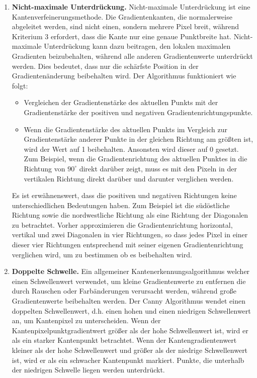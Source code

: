 \begin{enumerate}
	\item \textbf{Nicht-maximale Unterdrückung.} Nicht-maximale Unterdrückung ist eine Kantenverfeinerungsmethode. Die Gradientenkanten, die normalerweise abgeleitet werden, sind nicht einen, sondern mehrere Pixel breit, während Kriterium 3 erfordert, dass die Kante nur eine genaue Punktbreite hat. Nicht-maximale Unterdrückung kann dazu beitragen, den lokalen maximalen Gradienten beizubehalten, während alle anderen Gradientenwerte unterdrückt werden. Dies bedeutet, dass nur die schärfste Position in der Gradientenänderung beibehalten wird. Der Algorithmus funktioniert wie folgt:
	\begin{itemize}
	\item Vergleichen der Gradientenstärke des aktuellen Punkts mit der Gradientenstärke der positiven und negativen Gradientenrichtungspunkte.
	\item Wenn die Gradientenstärke des aktuellen Punkts im Vergleich zur Gradientenstärke anderer Punkte in der gleichen Richtung am größten ist, wird der Wert auf 1 beibehalten. Ansonsten wird dieser auf 0 gesetzt. Zum Beispiel, wenn die Gradientenrichtung des aktuellen Punktes in die Richtung von $90^{\circ}$ direkt darüber zeigt, muss es mit den Pixeln in der vertikalen Richtung direkt darüber und darunter verglichen werden.
	\end{itemize}
	
	Es ist erwähnenswert, dass die positiven und negativen Richtungen keine unterschiedlichen Bedeutungen haben. Zum Beispiel ist die südöstliche Richtung sowie die nordwestliche Richtung als eine Richtung der Diagonalen zu betrachtet. Vorher approximieren die Gradientenrichtung horizontal, vertikal und zwei Diagonalen in vier Richtungen, so dass jedes Pixel in einer dieser vier Richtungen entsprechend mit seiner eigenen Gradientenrichtung verglichen wird, um zu bestimmen ob es beibehalten wird. 
	
	
	\item \textbf{Doppelte Schwelle.} Ein allgemeiner Kantenerkennungsalgorithmus welcher einen Schwellenwert verwendet, um kleine Gradientenwerte zu entfernen die durch Rauschen oder Farbänderungen verursacht werden, während große Gradientenwerte beibehalten werden.
Der Canny Algorithmus wendet einen doppelten Schwellenwert, d.h. einen hohen und einen niedrigen Schwellenwert an, um Kantenpixel zu unterscheiden. Wenn der Kantenpixelpunktgradientwert größer als der hohe Schwellenwert ist, wird er als ein starker Kantenpunkt betrachtet. Wenn der Kantengradientenwert kleiner als der hohe Schwellenwert und größer als der niedrige Schwellenwert ist, wird er als ein schwacher Kantenpunkt markiert. Punkte, die unterhalb der niedrigen Schwelle liegen werden unterdrückt.


\end{enumerate}
